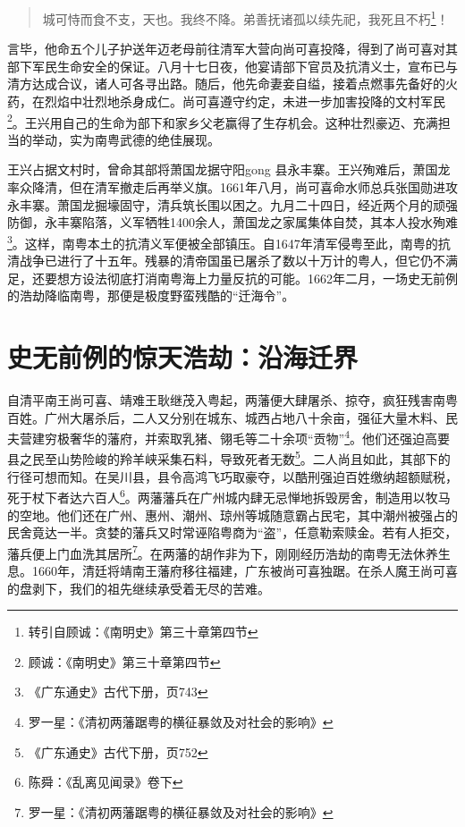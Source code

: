 \begin{quote}

城可恃而食不支，天也。我终不降。弟善抚诸孤以续先祀，我死且不朽\footnote{转引自顾诚：《南明史》第三十章第四节}！

\end{quote}

言毕，他命五个儿子护送年迈老母前往清军大营向尚可喜投降，得到了尚可喜对其部下军民生命安全的保证。八月十七日夜，他宴请部下官员及抗清义士，宣布已与清方达成合议，诸人可各寻出路。随后，他先命妻妾自缢，接着点燃事先备好的火药，在烈焰中壮烈地杀身成仁。尚可喜遵守约定，未进一步加害投降的文村军民\footnote{顾诚：《南明史》第三十章第四节}。王兴用自己的生命为部下和家乡父老赢得了生存机会。这种壮烈豪迈、充满担当的举动，实为南粤武德的绝佳展现。

王兴占据文村时，曾命其部将萧国龙据守阳gong 县永丰寨。王兴殉难后，萧国龙率众降清，但在清军撤走后再举义旗。1661年八月，尚可喜命水师总兵张国勋进攻永丰寨。萧国龙掘壕固守，清兵筑长围以困之。九月二十四日，经近两个月的顽强防御，永丰寨陷落，义军牺牲1400余人，萧国龙之家属集体自焚，其本人投水殉难\footnote{《广东通史》古代下册，页743}。这样，南粤本土的抗清义军便被全部镇压。自1647年清军侵粤至此，南粤的抗清战争已进行了十五年。残暴的清帝国虽已屠杀了数以十万计的粤人，但它仍不满足，还要想方设法彻底打消南粤海上力量反抗的可能。1662年二月，一场史无前例的浩劫降临南粤，那便是极度野蛮残酷的“迁海令”。


\section{史无前例的惊天浩劫：沿海迁界}

\indent 自清平南王尚可喜、靖难王耿继茂入粤起，两藩便大肆屠杀、掠夺，疯狂残害南粤百姓。广州大屠杀后，二人又分别在城东、城西占地八十余亩，强征大量木料、民夫营建穷极奢华的藩府，并索取乳猪、翎毛等二十余项“贡物”\footnote{罗一星：《清初两藩踞粤的横征暴敛及对社会的影响》 }。他们还强迫高要县之民至山势险峻的羚羊峡采集石料，导致死者无数\footnote{《广东通史》古代下册，页752}。二人尚且如此，其部下的行径可想而知。在吴川县，县令高鸿飞巧取豪夺，以酷刑强迫百姓缴纳超额赋税，死于杖下者达六百人\footnote{陈舜：《乱离见闻录》卷下}。两藩藩兵在广州城内肆无忌惮地拆毁房舍，制造用以牧马的空地。他们还在广州、惠州、潮州、琼州等城随意霸占民宅，其中潮州被强占的民舍竟达一半。贪婪的藩兵又时常诬陷粤商为“盗”，任意勒索赎金。若有人拒交，藩兵便上门血洗其居所\footnote{罗一星：《清初两藩踞粤的横征暴敛及对社会的影响》}。在两藩的胡作非为下，刚刚经历浩劫的南粤无法休养生息。1660年，清廷将靖南王藩府移往福建，广东被尚可喜独踞。在杀人魔王尚可喜的盘剥下，我们的祖先继续承受着无尽的苦难。

